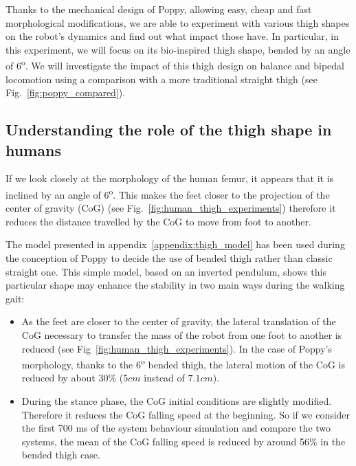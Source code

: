 Thanks to the mechanical design of Poppy, allowing easy, cheap and fast morphological modifications, we are able to experiment with various thigh shapes on the robot’s dynamics and find out what impact those have. In particular, in this experiment, we will focus on its bio-inspired thigh shape, bended by an angle of 6\textsuperscript{o}. We will investigate the impact of this thigh design on balance and bipedal locomotion using a comparison with a more traditional straight thigh (see Fig.~\ref{fig:poppy_compared}).



\subsection{Understanding the role of the thigh shape in humans} %

If we look closely at the morphology of the human femur, it appears that it is inclined by an angle of 6\textsuperscript{o}. This makes the feet closer to the projection of the center of gravity (CoG) (see Fig.~\ref{fig:human_thigh_experiments}) therefore it reduces the distance travelled by the CoG to move from foot to another.

The model presented in appendix~\ref{appendix:thigh_model} has been used during the conception of Poppy to decide the use of bended thigh rather than classic straight one. This simple model, based on an inverted pendulum, shows this particular shape may enhance the stability in two main ways during the walking gait:

\begin{itemize}
    \item As the feet are closer to the center of gravity, the lateral translation of the CoG necessary to transfer the mass of the robot from one foot to another is reduced (see Fig~\ref{fig:human_thigh_experiments}). In the case of Poppy's morphology, thanks to the $6$\textsuperscript{o} bended thigh, the lateral motion of the CoG is reduced by about 30\% ($ 5 cm$ instead of $7.1 cm$).
    \item During the stance phase, the CoG initial conditions are slightly modified. Therefore it reduces the CoG falling speed at the beginning. So if we consider the first 700 ms of the system behaviour simulation and compare the two systems, the mean of the CoG falling speed is reduced by around 56\% in the bended thigh case.
\end{itemize}


